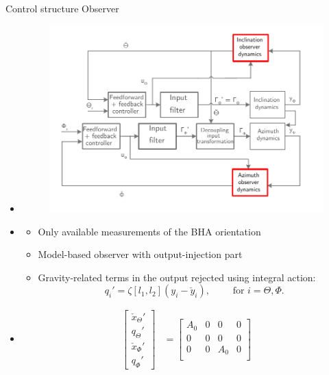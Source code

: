 \documentclass{beamer}
\begin{document}
\begin{frame}{Control structure}
Observer
\begin{itemize}\setlength{\leftmargini}{0pt}
\item <1|only@1> []
\begin{figure}[ht]\centering
	\includegraphics[width=1\textwidth]{images/ControlStrategy4.pdf}
\end{figure}
\item <2|only@2> []
\begin{itemize}\setlength\itemsep{3em}
				\item Only available measurements of the BHA orientation
				\item Model-based observer with output-injection part
				\item Gravity-related terms in the output rejected using integral action:
				\begin{equation*}
				q_i' = \zeta[l_1,l_2](y_i - \check{y}_i), \qquad \text{ for } i=\Theta,\Phi.
				\end{equation*}
\end{itemize}
\item <3|only@3> []
\footnotesize\begin{align*}
		\begin{bmatrix}
		\check{x}_\Theta' \\
		q_\Theta' \\
		\check{x}_\Phi'\\
		q_\Phi'
		\end{bmatrix} &=
		\begin{bmatrix}
		A_0 & 0 & 0 & 0\\
		0 & 0 & 0 & 0\\
		0 & 0 & A_0 & 0 \\

\end{bmatrix}
\end{align*}
\end{itemize}
\end{frame}
\end{document}
